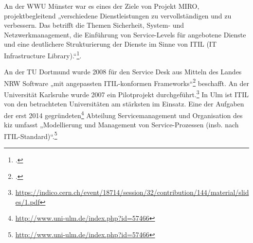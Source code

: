 An der WWU Münster war es eines der Ziele von Projekt MIRO, projektbegleitend „verschiedene Dienstleistungen zu vervollständigen und zu verbessern. Das betrifft die Themen Sicherheit, System- und Netzwerkmanagement, die Einführung von Service-Levels für angebotene Dienste und eine deutlichere Strukturierung der Dienste im Sinne von ITIL (IT Infrastructure Library).“\footcite{unimunster_projekt_miro_2015}.

An der TU Dortmund wurde 2008 für den Service Desk aus Mitteln des Landes NRW Software „mit angepassten ITIL-konformen Frameworks“\footcite{tudortmund_itmc_service_desk_2013} beschafft.
An der Universität Karlsruhe wurde 2007 ein Pilotprojekt durchgeführt.\footnote{\url{https://indico.cern.ch/event/18714/session/32/contribution/144/material/slides/1.pdf}}
In Ulm ist ITIL von den betrachteten Universitäten am stärksten im Einsatz. Eine der Aufgaben der erst 2014 gegründeten\footnote{\url{http://www.uni-ulm.de/index.php?id=57466}} Abteilung Servicemanagement und Organisation des kiz umfasst „Modellierung und Management von Service-Prozessen (insb. nach ITIL-Standard)“.\footnote{\url{http://www.uni-ulm.de/index.php?id=57466}}

